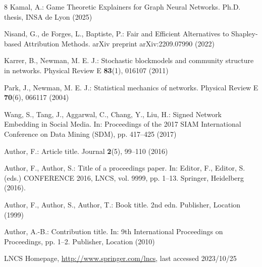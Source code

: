 \begin{thebibliography}{8}
Kamal, A.: Game Theoretic Explainers for Graph Neural Networks. Ph.D. thesis, INSA de Lyon (2025)

Nisand, G., de Forges, L., Baptiste, P.: Fair and Efficient Alternatives to Shapley-based Attribution Methods. arXiv preprint arXiv:2209.07990 (2022)

Karrer, B., Newman, M. E. J.: Stochastic blockmodels and community structure in networks. Physical Review E \textbf{83}(1), 016107 (2011)

Park, J., Newman, M. E. J.: Statistical mechanics of networks. Physical Review E \textbf{70}(6), 066117 (2004)

Wang, S., Tang, J., Aggarwal, C., Chang, Y., Liu, H.: Signed Network Embedding in Social Media. In: Proceedings of the 2017 SIAM International Conference on Data Mining (SDM), pp. 417--425 (2017)

Author, F.: Article title. Journal \textbf{2}(5), 99--110 (2016)

Author, F., Author, S.: Title of a proceedings paper. In: Editor,
F., Editor, S. (eds.) CONFERENCE 2016, LNCS, vol. 9999, pp. 1--13.
Springer, Heidelberg (2016). 

Author, F., Author, S., Author, T.: Book title. 2nd edn. Publisher,
Location (1999)

Author, A.-B.: Contribution title. In: 9th International Proceedings
on Proceedings, pp. 1--2. Publisher, Location (2010)

LNCS Homepage, \url{http://www.springer.com/lncs}, last accessed 2023/10/25
\end{thebibliography}